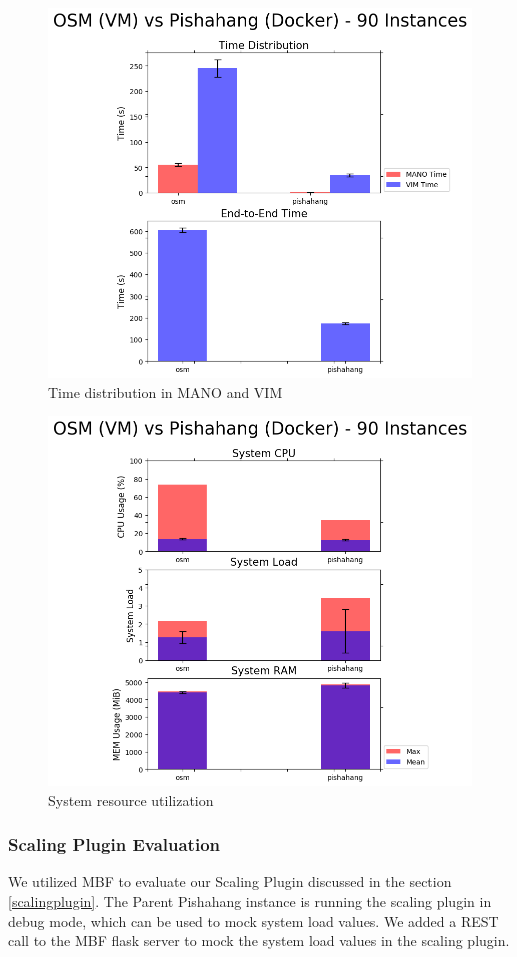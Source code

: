 \begin{figure}[h]
	\centering
	\includegraphics[width=0.7\linewidth]{figures/scalability_graphs/Comparison-VM-Docker/Time_comparison}
	\caption{Time distribution in MANO and VIM}
	\label{fig:timecomparison}
\end{figure}


\begin{figure}[h]
	\centering
	\includegraphics[width=0.7\linewidth]{figures/scalability_graphs/Comparison-VM-Docker/System_metrics_comparison}
	\caption{System resource utilization}
	\label{fig:systemmetricscomparison}
\end{figure}




\subsubsection{Scaling Plugin Evaluation}

We utilized MBF to evaluate our Scaling Plugin discussed in the section \ref{scalingplugin}. 
The Parent Pishahang instance is running the scaling plugin in debug mode, which can be used to mock system load values. 
We added a REST call to the MBF flask server to mock the system load values in the scaling plugin.\\

